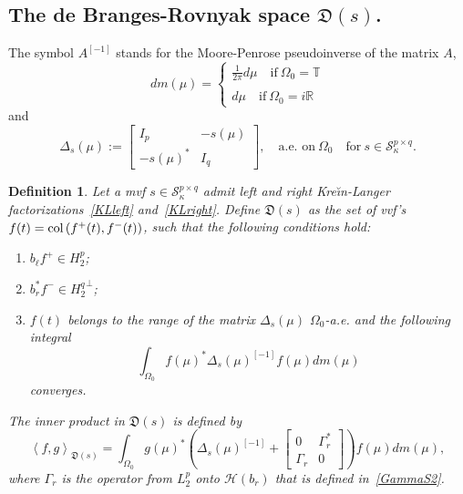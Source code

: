 \documentclass[12pt,twoside,a4paper]{amsart}
\newtheorem{definition}[thm]{Definition}
\theoremstyle{definition}
\numberwithin{equation}{section}
\begin{document}
\subsection{The de Branges-Rovnyak space ${{\mathfrak D}}(s)$.}
The symbol  $A^{[-1]}$ stands for the Moore-Penrose pseudoinverse of the matrix $A$,
$$
dm(\mu)=\left\{\begin{array}{l}\frac{1}{2\pi}d\mu\quad\text{if}\ \Omega_0={\mathbb{T}}
\\ \\
d\mu\quad\text{if}\ \Omega_0=i{\mathbb{R}}\end{array}\right.
$$
and
\begin{equation}\label{DeltaS}
\Delta_s(\mu):=\left[\begin{array}{cc}
I_p & -s(\mu)\\
-s(\mu)^* & I_q   \end{array} \right],  \quad \text{a.e. on}\  \Omega_0\quad
\text{for}\ s\in {\mathcal S}_{\kappa}^{p\times q}.
\end{equation}
\begin{definition}\label{WHDS}
    Let a mvf $s\in {\mathcal S}_{\kappa}^{p\times q}$ admit left and right Kre\u{\i}n-Langer
factorizations~\eqref{KLleft} and~\eqref{KLright}. Define ${{\mathfrak D}}(s)$
as the set of vvf's $ f(t)=\textup{col}\, (f^+(t), f^-(t))$, such
that  the following conditions hold:
\begin{enumerate}

\item[(${{\mathfrak D}}1$)]
$b_{\ell} f^+\in H_2^p$;
\item[(${{\mathfrak D}}2$)]
$b_r^* f^-\in {H_2^q}^\perp$;
\item[(${{\mathfrak D}}3$)]
$ f(t)$ belongs to the range of the matrix $\Delta_s(\mu)$ $\Omega_0$-a.e. and the
following integral
\[
\int_{\Omega_0}f(\mu)^*\Delta_s(\mu)^{[-1]} f(\mu)dm(\mu)
\]
converges.
\end{enumerate}
 The inner product in ${{\mathfrak D}}(s)$ is defined by
\begin{equation}\label{whDsInner}
  \left< f, g\right>_{{{\mathfrak D}}(s)}=\int_{\Omega_0}g(\mu)^*\left(\Delta_s(\mu)^{[-1]}+\left[\begin{array}{cc}
     0 & \Gamma_r^* \\
     \Gamma_r & 0
    \end{array}
    \right]\right) f(\mu)dm(\mu),
\end{equation}
where $\Gamma_r$ is the operator from ${L_2^p}$ onto
${{\mathcal H}}(b_r)$ that is defined in~\eqref{GammaS2}.
\end{definition}
\end{document}
